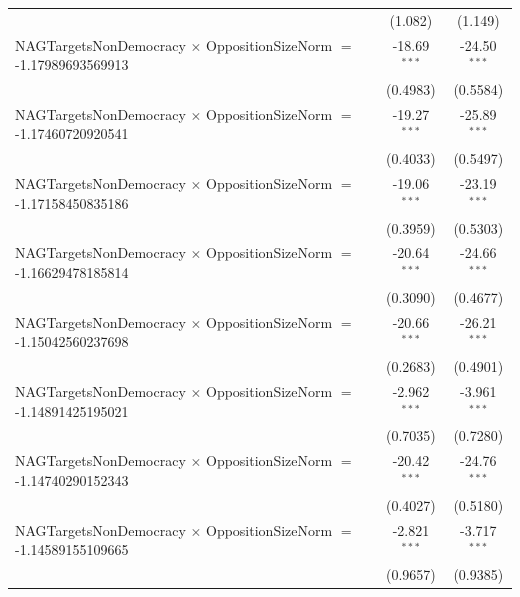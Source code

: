 \begin{tabular}{lcc}
                                                                                & (1.082)              & (1.149)\\   
   NAGTargetsNonDemocracy $\times$ OppositionSizeNorm $=$ -1.17989693569913     & -18.69$^{***}$       & -24.50$^{***}$\\   
                                                                                & (0.4983)             & (0.5584)\\   
   NAGTargetsNonDemocracy $\times$ OppositionSizeNorm $=$ -1.17460720920541     & -19.27$^{***}$       & -25.89$^{***}$\\   
                                                                                & (0.4033)             & (0.5497)\\   
   NAGTargetsNonDemocracy $\times$ OppositionSizeNorm $=$ -1.17158450835186     & -19.06$^{***}$       & -23.19$^{***}$\\   
                                                                                & (0.3959)             & (0.5303)\\   
   NAGTargetsNonDemocracy $\times$ OppositionSizeNorm $=$ -1.16629478185814     & -20.64$^{***}$       & -24.66$^{***}$\\   
                                                                                & (0.3090)             & (0.4677)\\   
   NAGTargetsNonDemocracy $\times$ OppositionSizeNorm $=$ -1.15042560237698     & -20.66$^{***}$       & -26.21$^{***}$\\   
                                                                                & (0.2683)             & (0.4901)\\   
   NAGTargetsNonDemocracy $\times$ OppositionSizeNorm $=$ -1.14891425195021     & -2.962$^{***}$       & -3.961$^{***}$\\   
                                                                                & (0.7035)             & (0.7280)\\   
   NAGTargetsNonDemocracy $\times$ OppositionSizeNorm $=$ -1.14740290152343     & -20.42$^{***}$       & -24.76$^{***}$\\   
                                                                                & (0.4027)             & (0.5180)\\   
   NAGTargetsNonDemocracy $\times$ OppositionSizeNorm $=$ -1.14589155109665     & -2.821$^{***}$       & -3.717$^{***}$\\   
                                                                                & (0.9657)             & (0.9385)\\   

\end{tabular}
